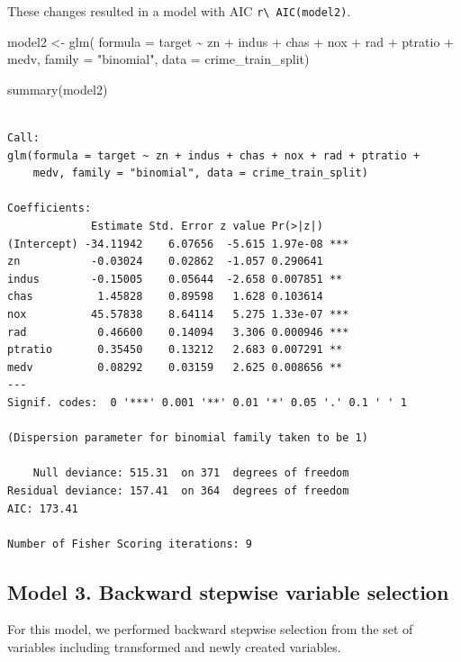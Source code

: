 \documentclass[
  11pt]{article}
\newenvironment{Shaded}{\begin{snugshade}}{\end{snugshade}}
\newcommand{\AttributeTok}[1]{\textcolor[rgb]{0.40,0.45,0.13}{#1}}
\newcommand{\FunctionTok}[1]{\textcolor[rgb]{0.28,0.35,0.67}{#1}}
\newcommand{\NormalTok}[1]{\textcolor[rgb]{0.00,0.23,0.31}{#1}}
\newcommand{\OtherTok}[1]{\textcolor[rgb]{0.00,0.23,0.31}{#1}}
\newcommand{\SpecialCharTok}[1]{\textcolor[rgb]{0.37,0.37,0.37}{#1}}
\newcommand{\StringTok}[1]{\textcolor[rgb]{0.13,0.47,0.30}{#1}}
\begin{document}
These changes resulted in a model with AIC
\texttt{r\textbackslash{}\ AIC(model2)}.

\begin{Shaded}
\begin{Highlighting}[]
\NormalTok{model2 }\OtherTok{\textless{}{-}} \FunctionTok{glm}\NormalTok{(}
  \AttributeTok{formula =}\NormalTok{ target }\SpecialCharTok{\textasciitilde{}}\NormalTok{ zn }\SpecialCharTok{+}\NormalTok{ indus }\SpecialCharTok{+}\NormalTok{ chas }\SpecialCharTok{+}\NormalTok{ nox }\SpecialCharTok{+}\NormalTok{ rad }\SpecialCharTok{+}\NormalTok{ ptratio }\SpecialCharTok{+}\NormalTok{ medv,}
  \AttributeTok{family =} \StringTok{"binomial"}\NormalTok{,}
  \AttributeTok{data =}\NormalTok{ crime\_train\_split)}

\FunctionTok{summary}\NormalTok{(model2)}
\end{Highlighting}
\end{Shaded}

\begin{verbatim}

Call:
glm(formula = target ~ zn + indus + chas + nox + rad + ptratio + 
    medv, family = "binomial", data = crime_train_split)

Coefficients:
             Estimate Std. Error z value Pr(>|z|)    
(Intercept) -34.11942    6.07656  -5.615 1.97e-08 ***
zn           -0.03024    0.02862  -1.057 0.290641    
indus        -0.15005    0.05644  -2.658 0.007851 ** 
chas          1.45828    0.89598   1.628 0.103614    
nox          45.57838    8.64114   5.275 1.33e-07 ***
rad           0.46600    0.14094   3.306 0.000946 ***
ptratio       0.35450    0.13212   2.683 0.007291 ** 
medv          0.08292    0.03159   2.625 0.008656 ** 
---
Signif. codes:  0 '***' 0.001 '**' 0.01 '*' 0.05 '.' 0.1 ' ' 1

(Dispersion parameter for binomial family taken to be 1)

    Null deviance: 515.31  on 371  degrees of freedom
Residual deviance: 157.41  on 364  degrees of freedom
AIC: 173.41

Number of Fisher Scoring iterations: 9
\end{verbatim}

\subsection{Model 3. Backward stepwise variable
selection}\label{model-3.-backward-stepwise-variable-selection}

For this model, we performed backward stepwise selection from the set of
variables including transformed and newly created variables.
\end{document}
